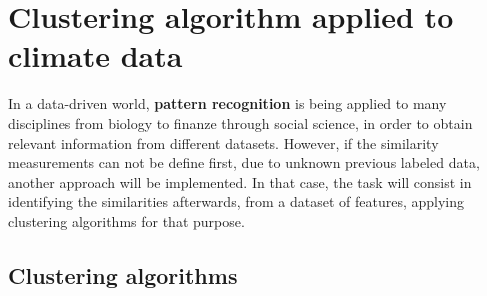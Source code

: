 \section{Clustering algorithm applied to climate data}




In a data-driven world, \textbf{pattern recognition} is being applied to many disciplines from biology to finanze through social science, in order to obtain relevant information from different datasets.
However, if the similarity measurements can not be define first, due to unknown previous labeled data, another approach will be implemented. In that case, the task will consist in identifying the similarities afterwards, from a dataset of features, applying clustering algorithms for that purpose.

\subsection{Clustering algorithms}

